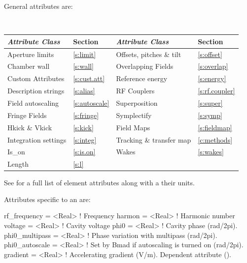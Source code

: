 {General  attributes are:
\begin{center}
\tt
\begin{tabular}{llll} \toprule
  {\sl Attribute Class}      & Section            & {\sl Attribute Class}      & Section            \\ \midrule
  Aperture limits            & \ref{s:limit}      & Offsets, pitches \& tilt   & \ref{s:offset}     \\
  Chamber wall               & \ref{s:wall}       & Overlapping Fields         & \ref{s:overlap}    \\
  Custom Attributes          & \ref{s:cust.att}   & Reference energy           & \ref{s:energy}     \\ 
  Description strings        & \ref{s:alias}      & RF Couplers                & \ref{s:rf.coupler} \\
  Field autoscaling          & \ref{s:autoscale}  & Superposition              & \ref{s:super}      \\
  Fringe Fields              & \ref{s:fringe}     & Symplectify                & \ref{s:symp}       \\
  Hkick \& Vkick             & \ref{s:kick}       & Field Maps                 & \ref{s:fieldmap}   \\
  Integration settings       & \ref{s:integ}      & Tracking \& transfer map   & \ref{c:methods}    \\
  Is_on                      & \ref{s:is.on}      & Wakes                      & \ref{s:wakes}      \\
  Length                     & \ref{s:l}          &                            &                    \\
  \bottomrule
\end{tabular}
\end{center}
\toffset
See  for a full list of element attributes along with a their units.

Attributes specific to an  are:
\begin{example}
  rf_frequency    = <Real>    ! Frequency
  harmon          = <Real>    ! Harmonic number
  voltage         = <Real>    ! Cavity voltage
  phi0            = <Real>    ! Cavity phase (rad/2pi).
  phi0_multipass  = <Real>    ! Phase variation with multipass (rad/2pi).
  phi0_autoscale  = <Real>    ! Set by Bmad if autoscaling is turned on (rad/2pi).
  gradient        = <Real>    ! Accelerating gradient (V/m). Dependent attribute ().
\end{example}

}

